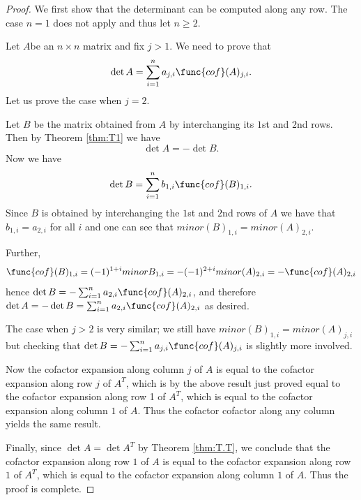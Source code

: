 \begin{proof} We first show that the determinant can be computed along any row. The case $n=1$ does not apply and thus let $n \geq 2$. 


Let $A$be an $n\times n$ matrix and fix $j>1$. We need to prove that
\[
	\det A=\sum_{i=1}^n a_{j,i} \func{cof}(A)_{j,i}. 
\]
Let us prove the case when $j=2$. 

Let $B$ be the matrix obtained from $A$ by interchanging its $1$st and $2$nd rows. 
Then by  Theorem \ref{thm:T1} we have
\[
\det A=-\det B. 
\]
Now we have 
\[
\det B=\sum_{i=1}^n b_{1,i} \func{cof}(B)_{1,i}. 
\]
Since $B$ is obtained by interchanging the $1$st and $2$nd rows of $A$
we have that $b_{1,i}=a_{2,i}$ for all $i$
and one can see that $minor(B)_{1,i}=minor(A)_{2,i}$. 

Further, 
\[
\func{cof}(B)_{1,i}=(-1)^{1+i} minor B_{1,i}=- (-1)^{2+i} minor (A)_{2,i} = - \func{cof}(A)_{2,i}
\]
hence $\det B=-\sum_{i=1}^n a_{2,i} \func{cof}(A)_{2,i}$, and therefore 
$\det A=-\det B=
\sum_{i=1}^n a_{2,i} \func{cof}(A)_{2,i}$ as desired. 

The case when $j>2$ is very similar; we still have
$minor(B)_{1,i}=minor (A)_{j,i}$ but checking that $\det
B=-\sum_{i=1}^n a_{j,i} \func{cof}(A)_{j,i}$ is slightly more
involved.

Now the cofactor expansion along column $j$ of $A$ is equal to the
cofactor expansion along row $j$ of $A^T$, which is by the above
result just proved equal to the cofactor expansion along row 1 of
$A^T$, which is equal to the cofactor expansion along column $1$ of
$A$. Thus the cofactor cofactor along any column yields the same result. 

Finally, since $\det A=\det A^T$ by  Theorem \ref{thm:T.T}, we conclude that 
the cofactor expansion along row $1$ of $A$ is equal to 
the cofactor expansion along row $1$ of $A^T$, which  is equal to 
the cofactor expansion along column $1$ of $A$. Thus the proof is complete. 
\end{proof} 
